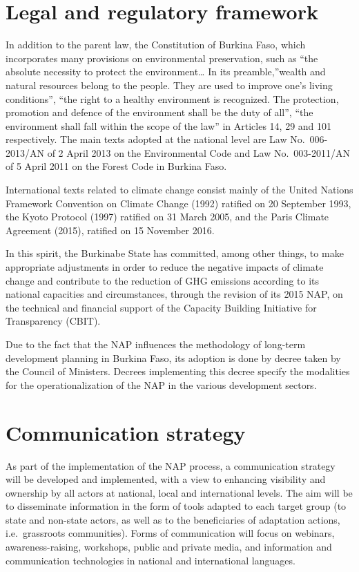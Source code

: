 \documentclass[
]{book}
\begin{document}
\section{Legal and regulatory framework}\label{legal-and-regulatory-framework}

In addition to the parent law, the Constitution of Burkina Faso, which incorporates many provisions on environmental preservation, such as ``the absolute necessity to protect the environment\ldots{} In its preamble,''wealth and natural resources belong to the people. They are used to improve one's living conditions'', ``the right to a healthy environment is recognized. The protection, promotion and defence of the environment shall be the duty of all'', ``the environment shall fall within the scope of the law'' in Articles 14, 29 and 101 respectively. The main texts adopted at the national level are Law No.~006-2013/AN of 2 April 2013 on the Environmental Code and Law No.~003-2011/AN of 5 April 2011 on the Forest Code in Burkina Faso.

International texts related to climate change consist mainly of the United Nations Framework Convention on Climate Change (1992) ratified on 20 September 1993, the Kyoto Protocol (1997) ratified on 31 March 2005, and the Paris Climate Agreement (2015), ratified on 15 November 2016.

In this spirit, the Burkinabe State has committed, among other things, to make appropriate adjustments in order to reduce the negative impacts of climate change and contribute to the reduction of GHG emissions according to its national capacities and circumstances, through the revision of its 2015 NAP, on the technical and financial support of the Capacity Building Initiative for Transparency (CBIT).

Due to the fact that the NAP influences the methodology of long-term development planning in Burkina Faso, its adoption is done by decree taken by the Council of Ministers. Decrees implementing this decree specify the modalities for the operationalization of the NAP in the various development sectors.

\section{Communication strategy}\label{communication-strategy}

As part of the implementation of the NAP process, a communication strategy will be developed and implemented, with a view to enhancing visibility and ownership by all actors at national, local and international levels. The aim will be to disseminate information in the form of tools adapted to each target group (to state and non-state actors, as well as to the beneficiaries of adaptation actions, i.e.~grassroots communities). Forms of communication will focus on webinars, awareness-raising, workshops, public and private media, and information and communication technologies in national and international languages.
\end{document}
